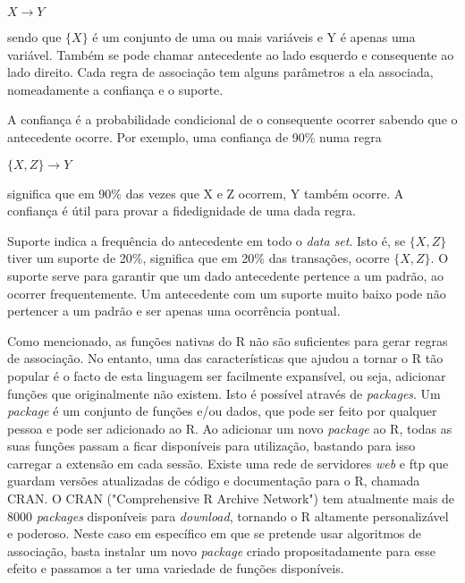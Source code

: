 ${X} \rightarrow Y $

sendo que $\{X\}$ é um conjunto de uma ou mais variáveis e Y é apenas uma variável. Também se pode chamar antecedente ao lado esquerdo e consequente ao lado direito. Cada regra de associação tem alguns parâmetros a ela associada, nomeadamente a confiança e o suporte.

A confiança é a probabilidade condicional de o consequente ocorrer sabendo que o antecedente ocorre. Por exemplo, uma confiança de 90\% numa regra 

$\{X, Z\} \rightarrow Y  $ 

significa que em 90\% das vezes que X e Z ocorrem, Y também ocorre. A confiança é útil para provar a fidedignidade de uma dada regra.

Suporte indica a frequência do antecedente em todo o \textit{data set}. Isto é, se $ \{X, Z\} $ tiver um suporte de 20\%, significa que em 20\% das transações, ocorre $\{X, Z\}$. O suporte serve para garantir que um dado antecedente pertence a um padrão, ao ocorrer frequentemente. Um antecedente com um suporte muito baixo pode não pertencer a um padrão e ser apenas uma ocorrência pontual.

Como mencionado, as funções nativas do R não são suficientes para gerar regras de associação. No entanto, uma das características que ajudou a tornar o R tão popular é o facto de esta linguagem ser facilmente expansível, ou seja, adicionar funções que originalmente não existem. Isto é possível através de \textit{packages}.
Um \textit{package} é um conjunto de funções e/ou dados, que pode ser feito por qualquer pessoa e pode ser adicionado ao R. Ao adicionar um novo \textit{package} ao R, todas as suas funções passam a ficar disponíveis para utilização, bastando para isso carregar a extensão em cada sessão. Existe uma rede de servidores \textit{web} e ftp que guardam versões atualizadas de código e documentação para o R, chamada CRAN. O CRAN ("Comprehensive R Archive Network") tem atualmente mais de 8000 \textit{packages} disponíveis para \textit{download}, tornando o R altamente personalizável e poderoso. 
Neste caso em específico em que se pretende usar algoritmos de associação, basta instalar um novo \textit{package} criado propositadamente para esse efeito e passamos a ter uma variedade de funções disponíveis. 

